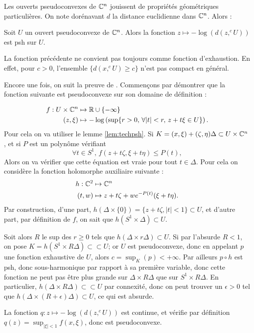 Les ouverts pseudoconvexes de $\mathbb{C}^n$ jouissent de propriétés géométriques particulières. On note dorénavant $d$ la distance euclidienne dans $\mathbb{C}^n$. Alors :
\begin{prop}
	Soit $U$ un ouvert pseudoconvexe de $\mathbb{C}^n$. Alors la fonction $z \mapsto -\log(d(z,^cU))$ est psh sur $U$.
\end{prop}
\begin{rem}
	La fonction précédente ne convient pas toujours comme fonction d'exhaustion. En effet, pour $c > 0$, l'ensemble $\{d(x,^cU) \geq c\}$ n'est pas compact en général.
\end{rem}
\begin{preuve}
	Encore une fois, on suit la preuve de \cite{demailly1997complex}. Commençons par démontrer que la fonction suivante est pseudoconvexe sur son domaine de définition :
	
\begin{align*}
	f: U \times \mathbb{C}^n &\mapsto \mathbb{R}\cup \{-\infty \}\\
	(z,\xi) &\mapsto -\log \left(\sup\{r >0,\,\forall |t| < r,\,z+t\xi \in U \} \right).
\end{align*}
Pour cela on va utiliser le lemme \ref{lem:techpsh}. Si $K=(x,\xi)+(\zeta, \eta)\Delta \subset U \times \mathbb{C}^n$, et si $P$ est un polynôme vérifiant
\begin{equation*}
	\forall t \in S^1,\,f(z+t\zeta,\xi+t\eta) \leq P(t),
\end{equation*}
Alors on va vérifier que cette équation est vraie pour tout $t \in \Delta$. Pour cela on considère la fonction holomorphe auxiliaire suivante :
\begin{align*}
	h:\mathbb{C}^2 &\mapsto \mathbb{C}^n\\
	(t,w)&\mapsto z+t\zeta + we^{-P(t)}(\xi+t\eta).
\end{align*}
Par construction, d'une part, $h(\Delta \times \{0\}) = \{z+t\zeta,|t| <1 \} \subset U$, et d'autre part, par définition de $f$, on sait que $h(S^1 \times \Delta) \subset U$.

Soit alors $R$ le sup des $r \geq 0$ tels que $h(\Delta \times r\Delta) \subset U$. Si par l'absurde $R<1$, on pose $K=h(S^1 \times R\Delta) \subset \subset U$; or $U$ est pseudoconvexe, donc en appelant $p$ une fonction exhaustive de $U$, alors $c=\sup_K(p)<+\infty$. Par ailleurs $p\circ h$ est psh, donc sous-harmonique par rapport à sa première variable, donc cette fonction ne peut pas être plus grande sur $\Delta \times R\Delta$ que sur $S^1 \times R\Delta$. En particulier, $h(\Delta \times R\Delta) \subset \subset U$ par connexité, donc on peut trouver un $\epsilon>0$ tel que $h(\Delta \times (R+\epsilon)\Delta) \subset U$, ce qui est absurde.

La fonction $q:z \mapsto -\log(d(z,^cU))$ est continue, et vérifie par définition $q(z)=\sup_{|\xi|<1}f(x,\xi)$, donc est pseudoconvexe.
\end{preuve}

